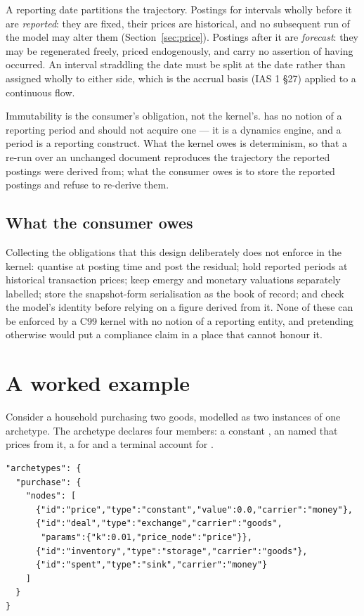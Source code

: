 \documentclass[11pt,a4paper]{article}
\begin{document}
A reporting date partitions the trajectory. Postings for intervals wholly before it are \emph{reported}: they are fixed, their prices are historical, and no subsequent run of the model may alter them (Section~\ref{sec:price}). Postings after it are \emph{forecast}: they may be regenerated freely, priced endogenously, and carry no assertion of having occurred. An interval straddling the date must be split at the date rather than assigned wholly to either side, which is the accrual basis (IAS 1 \S27) applied to a continuous flow.

Immutability is the consumer's obligation, not the kernel's. \gssk{} has no notion of a reporting period and should not acquire one --- it is a dynamics engine, and a period is a reporting construct. What the kernel owes is determinism, so that a re-run over an unchanged document reproduces the trajectory the reported postings were derived from; what the consumer owes is to store the reported postings and refuse to re-derive them.

\subsection{What the consumer owes}

Collecting the obligations that this design deliberately does not enforce in the kernel: quantise at posting time and post the residual; hold reported periods at historical transaction prices; keep emergy and monetary valuations separately labelled; store the snapshot-form serialisation as the book of record; and check the model's identity before relying on a figure derived from it. None of these can be enforced by a C99 kernel with no notion of a reporting entity, and pretending otherwise would put a compliance claim in a place that cannot honour it.

\section{A worked example}

Consider a household purchasing two goods, modelled as two instances of one archetype. The archetype declares four members: a constant , an  named  that prices from it, a  for  and a terminal account for .

\begin{lstlisting}[style=js]
"archetypes": {
  "purchase": {
    "nodes": [
      {"id":"price","type":"constant","value":0.0,"carrier":"money"},
      {"id":"deal","type":"exchange","carrier":"goods",
       "params":{"k":0.01,"price_node":"price"}},
      {"id":"inventory","type":"storage","carrier":"goods"},
      {"id":"spent","type":"sink","carrier":"money"}
    ]
  }
}
\end{lstlisting}
\end{document}
